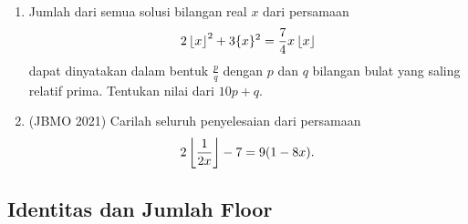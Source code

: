 \documentclass[12pt]{scrartcl}
\providecommand{\sumber}[1]{(#1)}
\begin{document}
\begin{enumerate}[resume]
	\item
	Jumlah dari semua solusi bilangan real $x$ dari persamaan
	\[ 2\left\lfloor x \right\rfloor^2 + 3\{x\}^2 = \frac{7}{4}x\left\lfloor x \right\rfloor \]
	dapat dinyatakan dalam bentuk $\frac{p}{q}$ dengan $p$ dan $q$
	bilangan bulat yang saling relatif prima.
	Tentukan nilai dari $10p + q$.

	\item \sumber{JBMO 2021}
	Carilah seluruh penyelesaian dari persamaan
	\[ 2\left\lfloor \frac{1}{2x} \right\rfloor - 7 = 9(1 - 8x). \]

\end{enumerate}

\subsection{Identitas dan Jumlah Floor}
\end{document}
